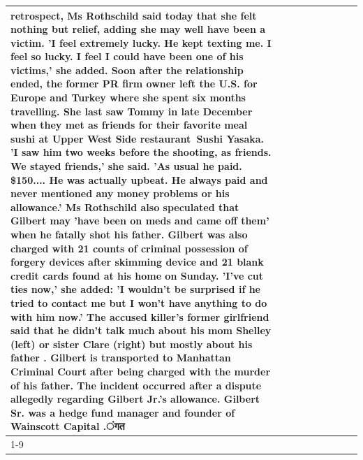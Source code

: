 \begin{table}[H]
\begin{tabular}{lllrlllll}
retrospect, Ms Rothschild said today that she felt nothing but relief, adding she may well have been a victim. 'I feel extremely lucky. He kept texting me. I feel so lucky. I feel I could have been one of his victims,' she added. Soon after the relationship ended, the former PR firm owner left the U.S. for Europe and Turkey where she spent six months  travelling. She last saw Tommy in late December when they met as friends for their favorite meal sushi at Upper West Side restaurant Sushi Yasaka. 'I saw him two weeks before the shooting, as friends. We stayed friends,' she said. 'As usual he paid. \$150.... He was actually upbeat. He always paid and never mentioned any money problems or his allowance.' Ms Rothschild also speculated that Gilbert may 'have been on meds and came off them' when he fatally shot his father. Gilbert was also charged with 21 counts of criminal possession of forgery devices after skimming device and 21 blank credit cards found at his home on Sunday. 'I've cut ties now,' she added: 'I wouldn’t be surprised if he tried to contact me but I won’t have anything to do with him now.' The accused killer's former girlfriend said that he didn't talk much about his mom Shelley (left) or sister Clare (right) but mostly about his father . Gilbert is transported to Manhattan Criminal Court  after being charged with the murder of his father. The incident occurred after a dispute allegedly regarding Gilbert Jr.'s allowance. Gilbert Sr. was a hedge fund manager and founder of Wainscott Capital .ंगत \\
\cline{1-9} \cline{2-9}

\end{tabular}
\end{table}
